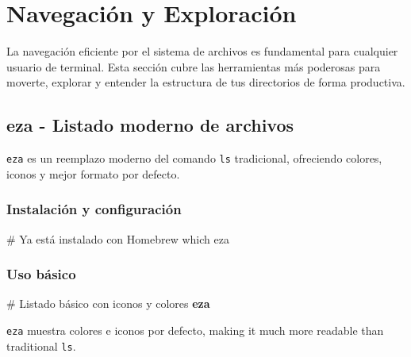 \documentclass[
  11pt,
  letterpaper,
  oneside,
  openany]{scrbook}
\newenvironment{Shaded}{}{}
\newcommand{\CommentTok}[1]{\textcolor[rgb]{0.42,0.45,0.49}{#1}}
\newcommand{\ExtensionTok}[1]{\textcolor[rgb]{0.84,0.23,0.29}{\textbf{#1}}}
\newcommand{\FunctionTok}[1]{\textcolor[rgb]{0.44,0.26,0.76}{#1}}
\newcommand{\NormalTok}[1]{\textcolor[rgb]{0.14,0.16,0.18}{#1}}
\begin{document}
\chapter{Navegación y
Exploración}\label{navegaciuxf3n-y-exploraciuxf3n-2}

La navegación eficiente por el sistema de archivos es fundamental para
cualquier usuario de terminal. Esta sección cubre las herramientas más
poderosas para moverte, explorar y entender la estructura de tus
directorios de forma productiva.

\section{eza - Listado moderno de archivos}\label{sec-eza}

\texttt{eza} es un reemplazo moderno del comando \texttt{ls}
tradicional, ofreciendo colores, iconos y mejor formato por defecto.

\subsection{Instalación y
configuración}\label{instalaciuxf3n-y-configuraciuxf3n}

\begin{Shaded}
\begin{Highlighting}[]
\CommentTok{\# Ya está instalado con Homebrew}
\FunctionTok{which}\NormalTok{ eza}
\end{Highlighting}
\end{Shaded}

\subsection{Uso básico}\label{uso-buxe1sico}

\begin{Shaded}
\begin{Highlighting}[]
\CommentTok{\# Listado básico con iconos y colores}
\ExtensionTok{eza}
\end{Highlighting}
\end{Shaded}

\begin{tcolorbox}[enhanced jigsaw, coltitle=black, breakable, arc=.35mm, toprule=.15mm, colbacktitle=quarto-callout-tip-color!10!white, colframe=quarto-callout-tip-color-frame, opacityback=0, colback=white, bottomtitle=1mm, bottomrule=.15mm, rightrule=.15mm, left=2mm, toptitle=1mm, leftrule=.75mm, title=\textcolor{quarto-callout-tip-color}{\faLightbulb}\hspace{0.5em}{Tip}, titlerule=0mm, opacitybacktitle=0.6]

\texttt{eza} muestra colores e iconos por defecto, making it much more
readable than traditional \texttt{ls}.

\end{tcolorbox}
\end{document}
